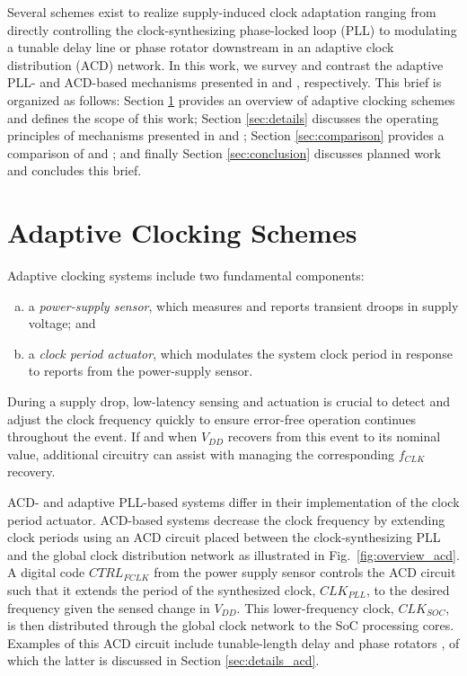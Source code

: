 \documentclass[twoside,9pt,journal,letterpage]{IEEEtran}
\begin{document}
Several schemes exist to realize supply-induced clock adaptation ranging from directly controlling the clock-synthesizing phase-locked loop (PLL)\cite{ahmad2017,hashimoto2018} to modulating a tunable delay line or phase rotator downstream in an adaptive clock distribution (ACD) network\cite{bowman2016,floyd2017,wilcox2015,kwak2016self}. In this work, we survey and contrast the adaptive PLL- and ACD-based mechanisms presented in \cite{hashimoto2018} and \cite{wilcox2015}, respectively. This brief is organized as follows: Section \ref{sec:overview} provides an overview of adaptive clocking schemes and defines the scope of this work; Section \ref{sec:details} discusses the operating principles of mechanisms presented in \cite{hashimoto2018} and \cite{wilcox2015}; Section \ref{sec:comparison} provides a comparison of \cite{hashimoto2018} and \cite{wilcox2015}; and finally Section \ref{sec:conclusion} discusses planned work and concludes this brief.

\IEEEpubidadjcol

\section{Adaptive Clocking Schemes}
\label{sec:overview}

Adaptive clocking systems include two fundamental components:

\begin{enumerate}[(a)]
\item a \textit{power-supply sensor}, which measures and
reports transient droops in supply voltage; and
\item a \textit{clock period actuator}, which modulates the
system clock period in response to reports from
the power-supply sensor.
\end{enumerate}

During a supply drop, low-latency sensing and actuation is crucial to detect and adjust the clock frequency quickly to ensure error-free operation continues throughout the event. If and when $V_{DD}$ recovers from this event to its nominal value, additional circuitry can assist with managing the corresponding $f_{CLK}$ recovery.

ACD- and adaptive PLL-based systems differ in their implementation of the clock period actuator. ACD-based systems decrease the clock frequency by extending clock periods using an ACD circuit placed between the clock-synthesizing PLL and the global clock distribution network as illustrated in Fig.\ \ref{fig:overview_acd}. A digital code $CTRL_{FCLK}$ from the power supply sensor controls the ACD circuit such that it extends the period of the synthesized clock, $CLK_{PLL}$, to the desired frequency given the sensed change in $V_{DD}$. This lower-frequency clock, $CLK_{SOC}$, is then distributed through the global clock network to the SoC processing cores. Examples of this ACD circuit include tunable-length delay \cite{bowman2016} and phase rotators \cite{wilcox2015}, of which the latter is discussed in Section \ref{sec:details_acd}.
\end{document}

